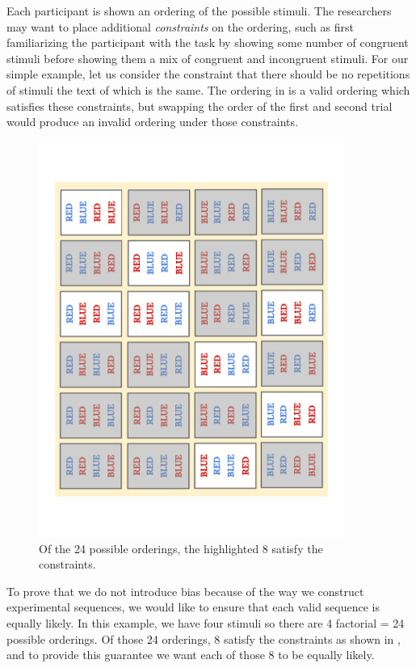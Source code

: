 Each participant is shown an ordering of the possible stimuli. The researchers may want to place additional \emph{constraints} on the ordering, such as first familiarizing the participant with the task by showing some number of congruent stimuli before showing them a mix of congruent and incongruent stimuli. For our simple example, let us consider the constraint that there should be no repetitions of stimuli the text of which is the same. The ordering in  is a valid ordering which satisfies these constraints, but swapping the order of the first and second trial would produce an invalid ordering under those constraints.

\begin{figure}[t]
    \centerline{\includegraphics[angle=270,origin=c,width=10cm]{fig_valid_seqs}}
    \caption{Of the 24 possible orderings, the highlighted 8 satisfy the constraints.}%
    \label{fig:valid_seqs}%
\end{figure}

To prove that we do not introduce bias because of the way we construct experimental sequences, we would like to ensure that each valid sequence is equally likely. In this example, we have four stimuli so there are 4 factorial = 24 possible orderings. Of those 24 orderings, 8 satisfy the constraints as shown in , and to provide this guarantee we want each of those 8 to be equally likely.







